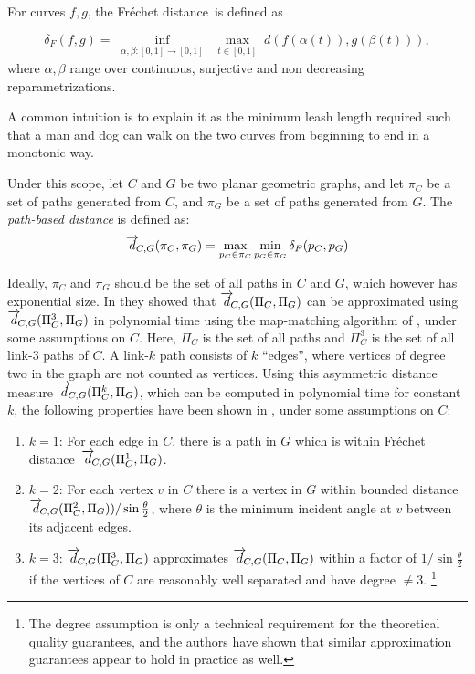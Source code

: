 \documentclass[natbib]{svjour3}                    \smartqed  \usepackage[table]{xcolor}
\newcommand{\distance}[4]{\overrightarrow{d}_{\hspace*{-.5ex}#1,#2}(#3,#4)}
\newcommand{\Frd}{Fr\'echet distance}
\begin{document}
For curves $f, g$, the \Frd\ is defined as

\begin{equation}
	\delta_{F}(f,g) = \inf_{\substack{\alpha,\beta:[0,1]\rightarrow [0,1]}}
	\max_{\substack{t\in\left[ 0,1\right] }}d(f(\alpha(t)),g(\beta(t))), 
\end{equation}
where $\alpha, \beta$ range over continuous, surjective and non decreasing
repara\-metrizations.

A common intuition is to explain it as the minimum leash length required such that a man and dog can walk on the two curves from beginning to end in a monotonic way.


Under this scope, let $C$ and $G$ be two planar geometric graphs, and let $\pi_C$ be a set of paths generated from $C$, and $\pi_G$ be a set of paths generated from $G$. The {\em path-based distance} is defined as:
\begin{equation}
\distance{C}{G}{\pi_C}{\pi_G} = \max_{p_C \in \pi_C}\min_{p_G \in \pi_G}\delta_F(p_C,p_G)
\end{equation}


Ideally, $\pi_C$ and $\pi_G$ should be the set of all paths in $C$ and $G$, which however has exponential size. In \cite{aw-SIGSPATIAL-13} they showed that $\distance{C}{G}{\Pi_C}{\Pi_G}$ can be approximated 
using $\distance{C}{G}{\Pi^{3}_C}{\Pi_G}$ in polynomial time using the map-matching algorithm of \cite{aerw-mpm-03}, under some assumptions on $C$. Here, $\Pi_C$ is the set of all paths and $\Pi^{3}_C$ is the set of all link-$3$ paths of $C$. 
A link-$k$ path consists of $k$ ``edges'', where vertices of degree two in the graph are not counted as vertices.
Using this asymmetric distance measure $\distance{C}{G}{\Pi^{k}_C}{\Pi_G}$, which can be computed in polynomial time
for constant $k$, the following properties have been shown in \cite{aw-SIGSPATIAL-13}, under some assumptions on $C$:

\begin{enumerate}
\item{$k=1$: For each edge in $C$, there is a path in $G$ which is within \Frd\ $\distance{C}{G}{\Pi^{1}_C}{\Pi_G}$.}
\item{$k=2$: For each vertex $v$ in $C$ there is a vertex in $G$ within bounded distance $\distance{C}{G}{\Pi^{2}_C}{\Pi_G})/\sin{\frac{\theta}{2}}$, where $\theta$ is the minimum incident angle at $v$ between its adjacent edges.}
\item{$k=3$: $\distance{C}{G}{\Pi^{3}_C}{\Pi_G}$ approximates $\distance{C}{G}{\Pi_C}{\Pi_G}$ within a factor of $1/\sin{\frac{\theta}{2}}$ if the vertices of $C$ are reasonably well separated and have degree $\neq 3$.
\footnote{The degree assumption is only a technical requirement for the theoretical quality guarantees, and the authors have shown \cite{aw-SIGSPATIAL-13} that similar approximation guarantees appear to hold in practice as well.}}
\end{enumerate}
\end{document}
